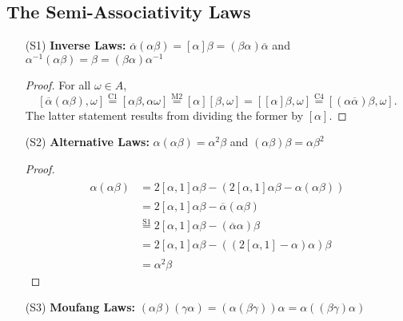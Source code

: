 \documentclass[10pt]{amsart}
\renewcommand{\bar}{\overline}
\newcommand{\norm}[1]{\left[#1\right]}
\begin{document}
\subsection{The Semi-Associativity Laws}
\begin{enumerate}
\item[(S1)] \textbf{Inverse Laws:}
$
\bar{\alpha}(\alpha\beta) = \norm{\alpha}\beta = (\beta \alpha)\bar{\alpha}
$
and
$
\alpha^{-1}(\alpha\beta) = \beta = (\beta \alpha)\alpha^{-1}
$

\begin{proof}
For all $\omega \in A$,
$$
\norm{\bar{\alpha}(\alpha\beta),\omega} \overset{\text{C}1}{=} \norm{\alpha \beta, \alpha \omega} \overset{\text{M}2}{=} \norm{\alpha}\norm{\beta, \omega} = \norm{\norm{\alpha}\beta, \omega} \overset{\text{C}4}{=} \norm{(\alpha \bar{\alpha})\beta,\omega}.
$$
The latter statement results from dividing the former by $\norm{\alpha}$.
\end{proof}

\item[(S2)] \textbf{Alternative Laws:}
$\alpha(\alpha\beta) = \alpha^2 \beta$ and $(\alpha \beta)\beta = \alpha\beta^2$

\begin{proof}
\begin{align*}
\alpha(\alpha \beta)
&\overset{\phantom{\text{S}1}}{=}
2\norm{\alpha,1}\alpha\beta - (2\norm{\alpha,1}\alpha\beta - \alpha(\alpha \beta))
\\
&\overset{\phantom{\text{S}1}}{=}
2\norm{\alpha,1}\alpha\beta - \bar{\alpha}(\alpha\beta)
\\
&\overset{\text{S}1}{=}
2\norm{\alpha,1}\alpha\beta - (\bar{\alpha}\alpha)\beta
\\
&\overset{\phantom{\text{S}1}}{=}
2\norm{\alpha,1}\alpha\beta - ((2\norm{\alpha,1}-\alpha)\alpha)\beta
\\
&\overset{\phantom{\text{S}1}}{=}
\alpha^2\beta
\end{align*}
\end{proof}

\item[(S3)] \textbf{Moufang Laws:}
$(\alpha \beta)(\gamma \alpha) = (\alpha(\beta \gamma))\alpha = \alpha((\beta \gamma)\alpha)$


\end{enumerate}
\end{document}
